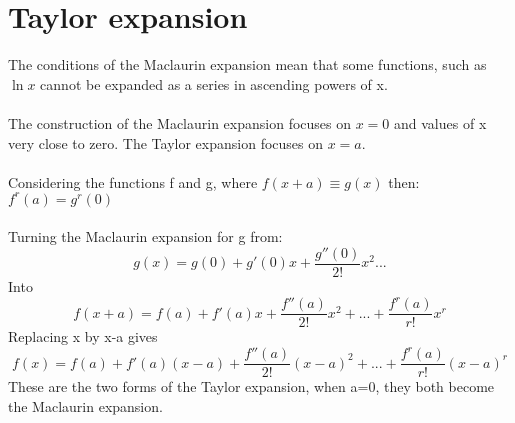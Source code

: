 \documentclass{article}[18pt]
\begin{document}
\section{Taylor expansion}
The conditions of the Maclaurin expansion mean that some functions, such as $\ln x$ cannot be expanded as a series in ascending powers of x.\\
\\
The construction of the Maclaurin expansion focuses on $x=0$ and values of x very close to zero. The Taylor expansion focuses on $x=a$.\\
\\
Considering the functions f and g, where $f(x+a)\equiv g(x)$ then:\\
$f^r(a)=g^r(0)$\\
\\
Turning the Maclaurin expansion for g from:
$$g(x)=g(0)+g'(0)x+\frac{g''(0)}{2!}x^2...$$
Into
$$f(x+a)=f(a)+f'(a)x+\frac{f''(a)}{2!}x^2+...+\frac{f^r(a)}{r!}x^r$$
Replacing x by x-a gives
$$f(x)=f(a)+f'(a)(x-a)+\frac{f''(a)}{2!}(x-a)^2+...+\frac{f^r(a)}{r!}(x-a)^r$$
These are the two forms of the Taylor expansion, when a=0, they both become the Maclaurin expansion.
\end{document}
